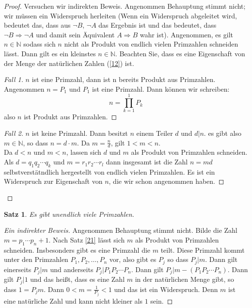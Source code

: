 \documentclass{article}
\theoremstyle{definition}
\theoremstyle{plain}
\newtheorem{sa}[definition]{Satz}
\begin{document}
\begin{proof}
	Versuchen wir indirekten Beweis. Angenommen Behauptung stimmt nicht; wir müssen ein Widerspruch herleiten (Wenn ein Widerspruch abgeleitet wird, bedeutet das, dass aus $ \neg B $, $ \neg A $ das Ergebnis ist und das bedeutet, dass $ \neg B \Rightarrow \neg A $ und damit sein Äquivalent $ A \Rightarrow B $ wahr ist). Angenommen, es gilt $ n \in \mathbb{N} $ sodass sich $ n $ nicht als Produkt von endlich vielen Primzahlen schneiden lässt. Dann gilt es ein kleinstes $ n \in \mathbb{N} $. Beachten Sie, dass es eine Eigenschaft von der Menge der natürlichen Zahlen (\ref{12}) ist. 
	\begin{proof}[Fall 1]\let\qed\relax
		$ n $ ist eine Primzahl, dann ist n bereits Produkt aus Primzahlen. Angenommen $ n = P_1 $ und $ P_1 $ ist eine Primzahl. Dann können wir schreiben:
		\[ 
		n = \prod\limits_{k=1}^1 P_k
		 \]	
		also $ n $ ist Produkt aus Primzahlen.
	\end{proof}
	\begin{proof}[Fall 2]\let\qed\relax
		$ n $ ist keine Primzahl. Dann besitzt $ n $ einem Teiler $ d $ und $ d|n $. es gibt also $ m \in \mathbb{N} $, so dass $ n = d\cdot m $. Da $ m = \frac{n}{d} $, gilt $ 1 < m < n $. \\
		Da $ d < n $ und $ m<n $, lassen sich $ d $ und $ m $ als Produkt von Primzahlen schneiden. Als
		$ d = q_1 q_2 \cdots q_k $ und $ m = r_1 r_2 \cdots r_l $ dann insgesamt ist die Zahl $ n = md $ selbstverstätndlich hergestellt von endlich vielen Primzahlen. Es ist ein Widerspruch zur Eigenschaft von $ n $, die wir schon angenommen haben.
	\end{proof}
\end{proof}
\begin{sa}
	Es gibt unendlich viele Primzahlen.
\end{sa}
\begin{proof}[Ein indirekter Beweis]
	Angenommen Behauptung stimmt nicht. Bilde die Zahl $ m = p_1 \cdots p_n + 1 $. Nach Satz \ref{21} lässt sich $ m $ als Produkt von Primzahlen schneiden. Insbesonders gibt es eine Primzahl die $ m $ teilt. Diese Primzahl kommt unter den Primzahlen $ P_1 ,P_2, \ldots , P_n $ vor, also gibt es $ P_j $ so dass $ P_j | m $. Dann gilt einerseits $ P_j | m $ und anderseits $ P_j | P_1P_2\cdots P_n $. Dann gilt $ P_j | m - (P_1P_2 \cdots P_n) $. Dann gilt $ P_j | 1 $ und das heißt, dass es eine Zahl $ m $ in der natürlichen Menge gibt, so dass $ 1 = P_j m $. Dann $ 0 < m = \frac{1}{P_j} < 1 $ und das ist ein Widerspruch. Denn $ m $ ist eine natürliche Zahl und kann nicht kleiner als $ 1 $ sein. 
\end{proof}
\end{document}
